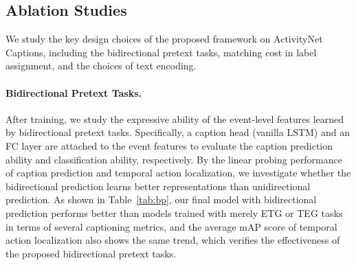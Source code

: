 \subsection{Ablation Studies} \label{sec-abl}
We study the key design choices of the proposed framework on ActivityNet Captions, including the bidirectional pretext tasks, matching cost in label assignment, and the choices of text encoding. 
\vspace{-1.0 em}
 \paragraph{\textbf{Bidirectional Pretext Tasks.}} After training, we study the expressive ability of the event-level features learned by bidirectional pretext tasks.  Specifically, a caption head (vanilla LSTM) and an FC layer are attached to the event features to evaluate the caption prediction ability and classification ability, respectively. By the linear probing performance of caption prediction and temporal action localization, we investigate whether the bidirectional prediction learns better representations than unidirectional prediction. 
As shown in Table~\ref{tab:bp}, our final model with bidirectional prediction performs better than models trained with merely ETG or TEG tasks in terms of several captioning metrics, and the average mAP score of temporal action localization also shows the same trend, which verifies the effectiveness of the proposed bidirectional pretext tasks.

\begin{table}[]
\caption{Ablation studies of bidirectional pretext tasks. The performance of temporal action localization is evaluated on ActivityNet 1.3~\cite{caba2015activitynet}, which shares the same videos with ActivityNet Captions. For ``w/o ETG", we remove the caption generator, and for ``w/o TEG", we remove the text encoding branch. }
\vspace{-0.5em}
\renewcommand\arraystretch{0.9}
\centering
    \small
    \makeatletter{}\makeatother
\label{tab:bp}
\vspace{-1.0em}
\end{table}

